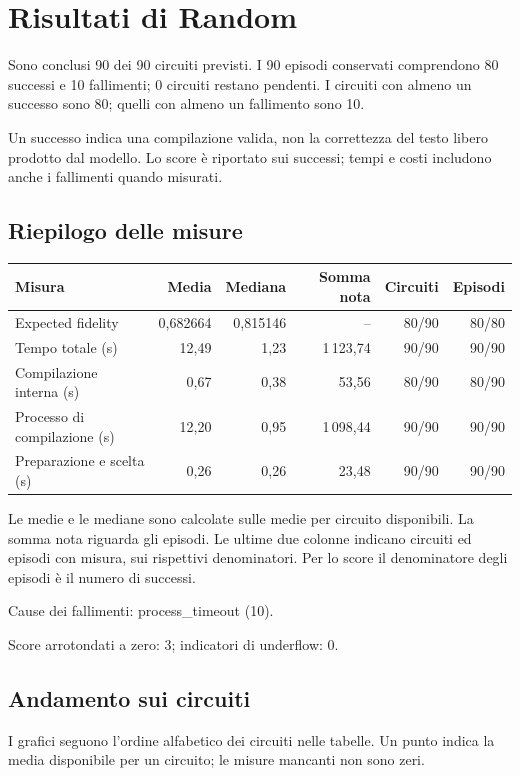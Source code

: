 \providecommand{\TestReportPath}{../}
\section{Risultati di Random}
Sono conclusi 90 dei 90 circuiti previsti. I 90 episodi conservati comprendono 80 successi e 10 fallimenti; 0 circuiti restano pendenti. I circuiti con almeno un successo sono 80; quelli con almeno un fallimento sono 10.

Un successo indica una compilazione valida, non la correttezza del testo libero prodotto dal modello. Lo score è riportato sui successi; tempi e costi includono anche i fallimenti quando misurati.

\subsection{Riepilogo delle misure}
\begingroup\footnotesize
\setlength{\tabcolsep}{5pt}
\begin{center}
\begin{tabular}{lrrrrr}
\toprule
Misura & Media & Mediana & Somma nota & Circuiti & Episodi \\
\midrule
Expected fidelity & 0,682664 & 0,815146 & -- & 80/90 & 80/80 \\
Tempo totale (s) & 12,49 & 1,23 & 1\,123,74 & 90/90 & 90/90 \\
Compilazione interna (s) & 0,67 & 0,38 & 53,56 & 80/90 & 80/90 \\
Processo di compilazione (s) & 12,20 & 0,95 & 1\,098,44 & 90/90 & 90/90 \\
Preparazione e scelta (s) & 0,26 & 0,26 & 23,48 & 90/90 & 90/90 \\
\bottomrule
\end{tabular}
\end{center}
\endgroup
Le medie e le mediane sono calcolate sulle medie per circuito disponibili. La somma nota riguarda gli episodi. Le ultime due colonne indicano circuiti ed episodi con misura, sui rispettivi denominatori. Per lo score il denominatore degli episodi è il numero di successi.

Cause dei fallimenti: process\_timeout (10).

Score arrotondati a zero: 3; indicatori di underflow: 0.
\subsection{Andamento sui circuiti}
I grafici seguono l’ordine alfabetico dei circuiti nelle tabelle. Un punto indica la media disponibile per un circuito; le misure mancanti non sono zeri.

